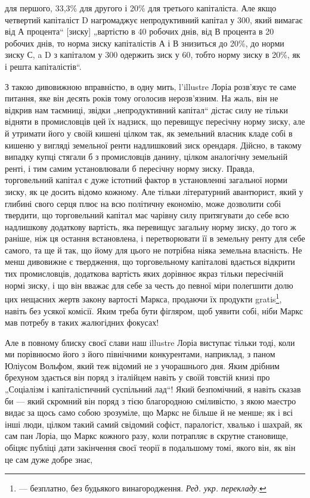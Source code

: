 \parcont{}  %
для першого, 33,3\%  для другого і 20\% для третього капіталіста.
Але якщо четвертий капіталіст D нагромаджує непродуктивний
капітал у 300, який вимагає від А процента“ [зиску]
„вартістю в 40 робочих днів, від В процента в 20 робочих днів,
то норма зиску капіталістів А і В знизиться до 20\%, до норми
зиску С, a D з капіталом у 300 одержить зиск у 60, тобто
норму зиску в 20\%, як і решта капіталістів“.

З такою дивовижною вправністю, в одну мить, l’illustre Лоріа
розв’язує те саме питання, яке він десять років тому оголосив
нерозв’язним. На жаль, він не відкрив нам таємниці, звідки
„непродуктивний капітал“ дістає силу не тільки відняти в промисловців
цей їх надзиск, що перевищує пересічну норму
зиску, але й утримати його у своїй кишені цілком так, як земельний
власник кладе собі в кишеню у вигляді земельної ренти надлишковий
зиск орендаря. Дійсно, в такому випадку купці стягали
б з промисловців данину, цілком аналогічну земельній ренті,
і тим самим установлювали б пересічну норму зиску. Правда,
торговельний капітал є дуже істотний фактор в установленні
загальної норми зиску, як це досить відомо кожному. Але тільки
літературний авантюрист, який у глибині свого серця плює на
всю політичну економію, може дозволити собі твердити, що
торговельний капітал має чарівну силу притягувати до себе
всю надлишкову додаткову вартість, яка перевищує загальну
норму зиску, до того ж раніше, ніж ця остання встановлена,
і перетворювати її в земельну ренту для себе самого, та ще
й так, що йому для цього не потрібна ніяка земельна власність.
Не менш дивовижне є твердження, що торговельному капіталові
вдається відкрити тих промисловців, додаткова вартість яких
дорівнює якраз тільки пересічній нормі зиску, і що він вважає для
себе за честь до певної міри полегшити долю цих нещасних жертв
закону вартості Маркса, продаючи їх продукти gratis\footnote*{
— безплатно, без будьякого винагородження. \emph{Ред. укр. перекладу.}
}, навіть
без усякої комісії. Яким треба бути фігляром, щоб уявити собі,
ніби Маркс мав потребу в таких жалюгідних фокусах!

Але в повному блиску своєї слави наш illustre Лоріа виступає
тільки тоді, коли ми порівнюємо його з його північними
конкурентами, наприклад, з паном Юліусом Вольфом, який теж
відомий не з учорашнього дня. Яким дрібним брехуном здається він
поряд з італійцем навіть у своїй товстій книзі про „Соціалізм
і капіталістичний суспільний лад“! Який безпомічний, я навіть
сказав би — який скромний він поряд з тією благородною сміливістю,
з якою маестро видає за щось само собою зрозуміле,
що Маркс не більше й не менше; як і всі інші люди, цілком
такий самий свідомий софіст, паралогіст, хвалько і шахрай, як
сам пан Лоріа, що Маркс кожного разу, коли потрапляє в
скрутне становище, обіцяє публіці дати закінчення своєї теорії
в подальшому томі, якого він, як він це сам дуже добре знає,
\parbreak{}  %
